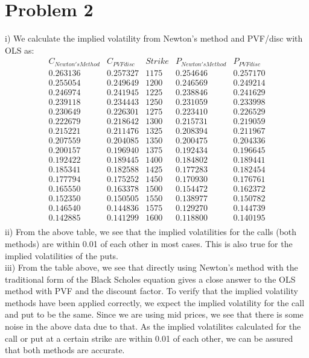 \documentclass{article}
\begin{document}
\section*{Problem 2}
i) We calculate the implied volatility from Newton's method and PVF/disc with OLS as:
\begin{equation*}
\begin{array}{ccccc}
C_{Newton's Method} & C_{PVF disc} & Strike & P_{Newton's Method} & P_{PVF disc} \\
0.263136 & 0.257327 & 1175 & 0.254646 & 0.257170 \\ 
0.255054 & 0.249649 & 1200 & 0.246569 & 0.249214 \\ 
0.246974 & 0.241945 & 1225 & 0.238846 & 0.241629 \\ 
0.239118 & 0.234443 & 1250 & 0.231059 & 0.233998 \\ 
0.230649 & 0.226301 & 1275 & 0.223410 & 0.226529 \\ 
0.222679 & 0.218642 & 1300 & 0.215731 & 0.219059 \\ 
0.215221 & 0.211476 & 1325 & 0.208394 & 0.211967 \\ 
0.207559 & 0.204085 & 1350 & 0.200475 & 0.204336 \\ 
0.200157 & 0.196940 & 1375 & 0.192434 & 0.196645 \\ 
0.192422 & 0.189445 & 1400 & 0.184802 & 0.189441 \\ 
0.185341 & 0.182588 & 1425 & 0.177283 & 0.182454 \\ 
0.177794 & 0.175252 & 1450 & 0.170930 & 0.176761 \\ 
0.165550 & 0.163378 & 1500 & 0.154472 & 0.162372 \\ 
0.152350 & 0.150505 & 1550 & 0.138977 & 0.150782 \\ 
0.146540 & 0.144836 & 1575 & 0.129270 & 0.144739 \\ 
0.142885 & 0.141299 & 1600 & 0.118800 & 0.140195 \\ 
  \end{array}
\end{equation*}
ii) From the above table, we see that the implied volatilities for the calls (both methods) are within 0.01 of each other in most cases. This is also true for the implied volatilities of the puts. 
\vspace{5mm} \\
iii) From the table above, we see that directly using Newton's method with the traditional form of the Black Scholes equation gives a close answer to the OLS method with PVF and the discount factor. To verify that the implied volatility methods have been applied correctly, we expect the implied volatility for the call and put to be the same. Since we are using mid prices, we see that there is some noise in the above data due to that. As the implied volatilites calculated for the call or put at a certain strike are within 0.01 of each other, we can be assured that both methods are accurate.
\end{document}
